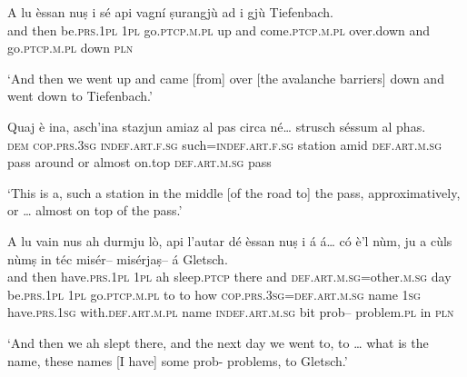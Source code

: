 \begin{linenumbers}
\gll A lu èssan nuṣ i sé api vagní ṣurangjù ad i gjù Tiefenbach.   \\
and then  be.\textsc{prs.1pl} \textsc{1pl} go.\textsc{ptcp.m.pl} up and come.\textsc{ptcp.m.pl} over.down and  go.\textsc{ptcp.m.pl} down \textsc{pln} \\
\end{linenumbers} 
\medskip
\glt `And then we went up and came [from] over [the avalanche barriers] down and went down to Tiefenbach.'
\medskip

\begin{linenumbers}
\gll Quaj è ina, asch’ina stazjun amiaz al pas circa né… strusch séssum al phas.   \\
 \textsc{dem} \textsc{cop.prs.3sg} \textsc{indef.art.f.sg} such=\textsc{indef.art.f.sg} station amid \textsc{def.art.m.sg} pass around or almost on.top \textsc{def.art.m.sg} pass\\
\end{linenumbers}
\medskip
\glt `This is a, such a station in the middle [of the road to] the pass, approximatively, or … almost on top of the pass.'
\medskip

\begin{linenumbers}
\gll  A lu vain nus ah durmju lò, api l’autar dé èssan nuṣ i á á… có è’l nùm, ju a cùls nùmṣ in téc misér– misérjaṣ–  á Gletsch.  \\ 
and then have.\textsc{prs.1pl} \textsc{1pl} ah sleep.\textsc{ptcp} there and  \textsc{def.art.m.sg=}other.\textsc{m.sg} day  be.\textsc{prs.1pl} \textsc{1pl} go.\textsc{ptcp.m.pl} to to how \textsc{cop.prs.3sg}=\textsc{def.art.m.sg} name \textsc{1sg} have.\textsc{prs.1sg} with.\textsc{def.art.m.pl} name \textsc{indef.art.m.sg} bit prob– problem.\textsc{pl} in \textsc{pln} \\
\end{linenumbers}
\medskip
\glt `And then we ah slept there, and the next day we went to, to … what is the name, these names [I have] some prob- problems, to Gletsch.'
\medskip

